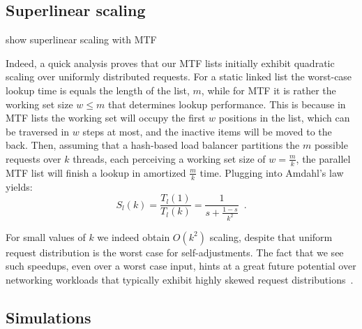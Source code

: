 \subsection{Superlinear scaling}
\label{sec:arch-scaling}


show superlinear scaling with MTF

Indeed, a quick analysis proves that our MTF lists initially exhibit quadratic scaling over uniformly distributed requests. For a static linked list the worst-case lookup time is equals the length of the list, $m$, while for MTF it is rather the working set size $w\le m$ that determines lookup performance. This is because in MTF lists the working set will occupy the first $w$ positions in the list, which can be traversed in $w$ steps at most, and the inactive items will be moved to the back. Then, assuming that a hash-based load balancer partitions the $m$ possible requests over $k$ threads, each perceiving a working set size of $w=\frac{m}{k}$, the parallel MTF list will finish a lookup in amortized $\frac{m}{k}$ time. Plugging into Amdahl's law yields:
\begin{equation}\label{eq:mtf-perf}
  S_l(k) = \frac{T_l(1)}{T_l(k)} = \frac1{s + \frac{1-s}{k^2}} \enspace .
\end{equation}

For small values of $k$ we indeed obtain $O(k^2)$ scaling, despite that uniform request distribution is the worst case for self-adjustments. The fact that we see such speedups, even over a worst case input, hints at a great future potential over networking workloads that typically exhibit highly skewed request distributions~\cite{832484}.

\subsection{Simulations}
\label{sec:sims}

